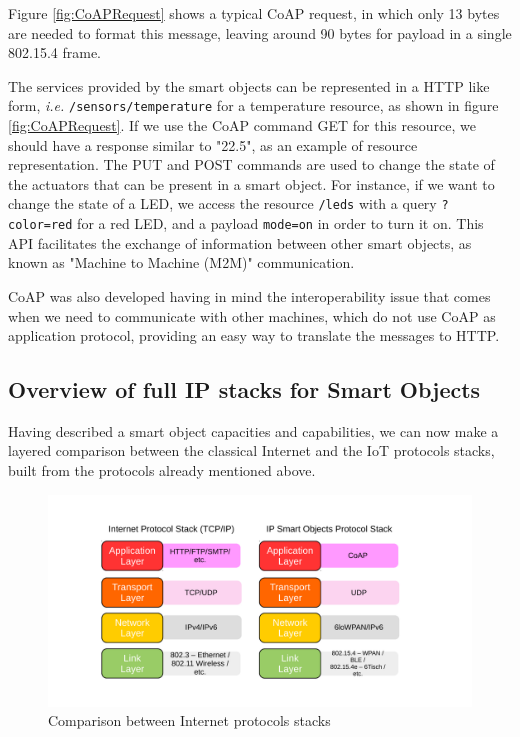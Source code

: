Figure \ref{fig:CoAPRequest} shows a typical CoAP request, in which only 13 bytes are needed to format this message, leaving around 90 bytes for payload in a single 802.15.4 frame.

The services provided by the smart objects can be represented in a HTTP like form, \textit{i.e.} \texttt{/sensors/temperature} for a temperature resource, as shown in figure \ref{fig:CoAPRequest}. If we use the CoAP command GET for this resource, we should have a response similar to "22.5", as an example of resource representation.
The PUT and POST commands are used to change the state of the actuators that can be present in a smart object.
For instance, if we want to change the state of a LED, we access the resource \texttt{/leds} with a query \texttt{?color=red} for a red LED, and a payload \texttt{mode=on} in order to turn it on.
This API facilitates the exchange of information between other smart objects, as known as "Machine to Machine (M2M)" communication.

CoAP was also developed having in mind the interoperability issue that comes when we need to communicate with other machines, which do not use CoAP as application protocol, providing an easy way to translate the messages to HTTP.

\subsection{Overview of full IP stacks for Smart Objects}
Having described a smart object capacities and capabilities, we can now make a layered comparison between the classical Internet and the IoT protocols stacks, built from the protocols already mentioned above.

\begin{figure}[htb]
	\centering
	\includegraphics[width=1\columnwidth]{chapters/background.images/Layers.pdf}
	\caption{Comparison between Internet protocols stacks}
	\label{fig:IPLayers}
\end{figure}

